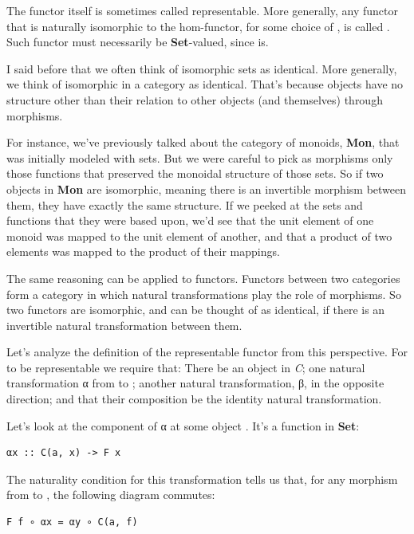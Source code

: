 The functor  itself is sometimes called representable.
More generally, any functor  that is naturally isomorphic to
the hom-functor, for some choice of , is called
. Such functor must necessarily be
\textbf{Set}-valued, since  is.

I said before that we often think of isomorphic sets as identical. More
generally, we think of isomorphic  in a category as
identical. That's because objects have no structure other than their
relation to other objects (and themselves) through morphisms.

For instance, we've previously talked about the category of monoids,
\textbf{Mon}, that was initially modeled with sets. But we were careful
to pick as morphisms only those functions that preserved the monoidal
structure of those sets. So if two objects in \textbf{Mon} are
isomorphic, meaning there is an invertible morphism between them, they
have exactly the same structure. If we peeked at the sets and functions
that they were based upon, we'd see that the unit element of one monoid
was mapped to the unit element of another, and that a product of two
elements was mapped to the product of their mappings.

The same reasoning can be applied to functors. Functors between two
categories form a category in which natural transformations play the
role of morphisms. So two functors are isomorphic, and can be thought of
as identical, if there is an invertible natural transformation between
them.

Let's analyze the definition of the representable functor from this
perspective. For  to be representable we require that: There
be an object  in \emph{C}; one natural transformation α from
 to ; another natural transformation, β, in
the opposite direction; and that their composition be the identity
natural transformation.

Let's look at the component of α at some object . It's a
function in \textbf{Set}:

\begin{verbatim}
αx :: C(a, x) -> F x
\end{verbatim}

The naturality condition for this transformation tells us that, for any
morphism  from  to , the following diagram
commutes:

\begin{verbatim}
F f ∘ αx = αy ∘ C(a, f)
\end{verbatim}

